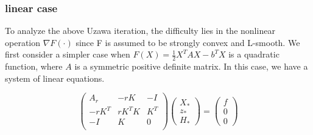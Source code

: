 \begin{comment} 
\begin{lemma}
For the error propagation matrix, we have $\rho(I - N^{-1}S) =\eta < 1$. 
\end{lemma}
\begin{proof}
\textcolor{red}{We found this part is not accurate and need to modify.
First, we observe that $I - N^{-1}S$ is given as follows:


where $E := K^T K = n I$, $Q_A = I - r A_r^{-1}$. We note that 

By $2\times 2$ block matrix decomposition, we have the error propagation matrix is spectrally equivalent to the following matrix
\begin{equation}\label{mat1}
    \begin{pmatrix}
   S1 & 0 \\
 0   &
 S_2 + S_3   \end{pmatrix},
\end{equation}
where $S_1 = I -   E^{-1} K^T Q_A K$, $S_2 = (I - M_2)Q_A $, $S_3 = (I- M_2) Q_A K (I - E^{-1} K^T Q_A K )^{-1} E^{-1} K^T Q_A $.

It is easy to see that $S_1$ is symmetric positive and has $\rho(S_1) < 1$.
We also have $\rho(S_2) \leq \frac{C_0}{r + C_0}$, $\rho(S_3) \leq \frac{C_0}{ r+C_0}\frac{r +C_0}{r} \frac{C_0}{r +C_0 }$. So $\rho(S_2 + S_3) \leq \frac{C_0}{r} \le 1 $ for sufficiently large $r$. 

We can then take $\eta = \min \{ \rho(S_1), \frac{C_0}{r} \}$. This completes the proof.}
\end{proof}
\end{comment} 

\subsubsection{linear case}
To analyze the above Uzawa iteration, the difficulty lies in the nonlinear operation $\nabla F(\cdot)$ since F is assumed to be strongly convex and L-smooth. We first consider a simpler case when $F(X) = \frac{1}{2} X^T A X - b^T X$ is a quadratic function, where $A$ is a symmetric positive definite matrix. In this case, we have a system of linear equations. 

\begin{equation}
\label{optimality condition in linear case}
    \begin{pmatrix}
    A_r & -r K & -I \\
    -r K^T& r K^TK & K^T\\
    -I& K & 0\\
    \end{pmatrix}
    \begin{pmatrix}
    X_*\\
    z_* \\
    H_*
    \end{pmatrix} = 
    \begin{pmatrix}
    f\\
    0\\
    0
    \end{pmatrix}
\end{equation}

